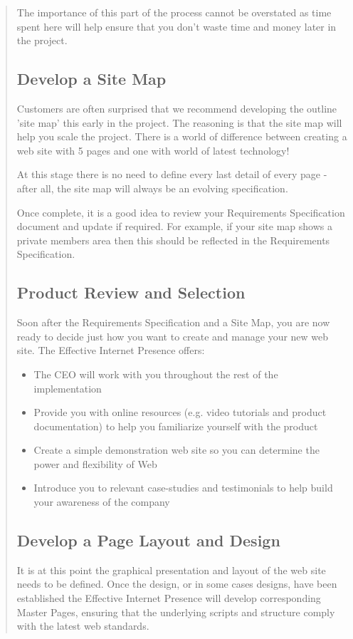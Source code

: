\documentclass[35pt]{report}
\begin{document}
\begin{quote}
		The importance of this part of the process cannot be overstated as time spent here will help ensure that you don't waste time and money later in the project.

			\subsection{Develop a Site Map}
			Customers are often surprised that we recommend developing the outline 'site map' this early in the project. The reasoning is that the site map will help you scale the project. There is a world of difference between creating a web site with 5 pages and one with world of latest technology!

			At this stage there is no need to define every last detail of every page - after all, the site map will always be an evolving specification.

			Once complete, it is a good idea to review your Requirements Specification document and update if required. For example, if your site map shows a private members area then this should be reflected in the Requirements Specification.

			\subsection{Product Review and Selection}
			Soon after the Requirements Specification and a Site Map, you are now ready to decide just how you want to create and manage your new web site. The Effective Internet Presence offers:
		
		\begin{itemize}
			\item The CEO will work with you throughout the rest of the implementation
			\item Provide you with online resources (e.g. video tutorials and product documentation) to help you familiarize yourself with the product
			\item Create a simple demonstration web site so you can determine the power and flexibility of Web 
			\item Introduce you to relevant case-studies and testimonials to help build your awareness of the company
		\end{itemize}	

			\subsection{Develop a Page Layout and Design}
			It is at this point the graphical presentation and layout of the web site needs to be defined. Once the design, or in some cases designs, have been established the Effective Internet Presence will develop corresponding Master Pages, ensuring that the underlying scripts and structure comply with the latest web standards.


\end{quote}
\end{document}

